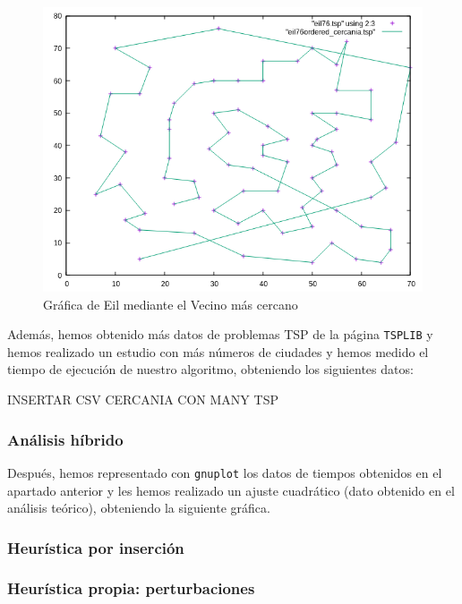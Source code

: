 \documentclass[10pt,a4paper]{article}
\begin{document}
\begin{itemize}
	\begin{figure}[h!]
	\centering
	\includegraphics[scale=0.5]{./Images/eil_cercania.png}
	\caption{Gráfica de Eil mediante el Vecino más cercano}
	\end{figure}
\end{itemize}

Además, hemos obtenido más datos de problemas TSP de la página \texttt{TSPLIB} y hemos realizado un estudio con más números de ciudades y hemos medido el tiempo de ejecución de nuestro algoritmo, obteniendo los siguientes datos:

INSERTAR CSV CERCANIA CON MANY TSP

\subsubsection*{Análisis híbrido}

Después, hemos representado con \texttt{gnuplot} los datos de tiempos obtenidos en el apartado anterior y les hemos realizado un ajuste cuadrático (dato obtenido en el análisis teórico), obteniendo la siguiente gráfica.

\subsubsection{Heurística por inserción}

\subsubsection{Heurística propia: perturbaciones}
\end{document}
